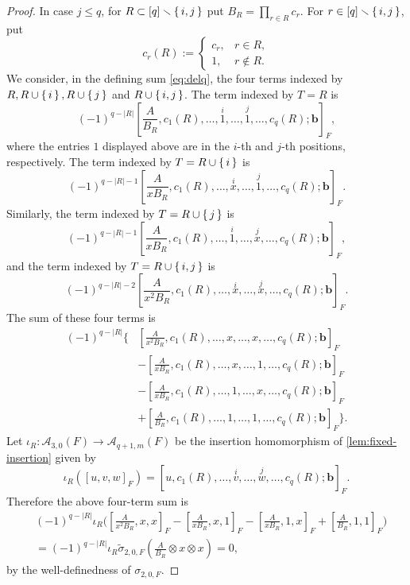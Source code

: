 \documentclass[a4paper,12pt,reqno]{amsart}
\numberwithin{equation}{section}
\theoremstyle{definition}
\newcommand{\Acal}{\mathcal{A}}
\begin{document}
\begin{proof}
In case $j \leq q$, 
for $R\subset[q]\smallsetminus\set{i,j}$ put
$B_R=\prod_{r\in R}c_r$.  
For $r\in[q]\smallsetminus\set{i,j}$, put
\[
 c_r(R):=
 \begin{cases}
 c_r,&r\in R,\\
 1,&r\notin R.
 \end{cases}
\]
We consider, in the defining sum \eqref{eq:delq}, the four terms
indexed by $R, R\cup \set{i}, R\cup \set{j}$ and $R\cup \set{i,j}$. 
The term indexed by $T=R$ is
\[
 (-1)^{q-|R|}
 \left[
 \frac{A}{B_R},
 c_1(R),\ldots,\overset{i}{1},\ldots,\overset{j}{1},\ldots,c_q(R);
 \mathbf b
 \right]_F,
\]
where the entries $1$ displayed above are in the $i$-th and $j$-th
positions, respectively.
The term indexed by $T=R\cup\set{i}$ is
\[
 (-1)^{q-|R|-1}
 \left[
 \frac{A}{xB_R},
 c_1(R),\ldots,\overset{i}x,\ldots,\overset{j}1,\ldots,c_q(R);
 \mathbf b
 \right]_F.
\]
Similarly, the term indexed by $T=R\cup\set{j}$ is
\[
 (-1)^{q-|R|-1}
 \left[
 \frac{A}{xB_R},
 c_1(R),\ldots,\overset{i}{1},\ldots,\overset{j}{x},\ldots,c_q(R);
 \mathbf b
 \right]_F,
\]
and the term indexed by $T=R\cup\set{i,j}$ is
\[
 (-1)^{q-|R|-2}
 \left[
 \frac{A}{x^2B_R},
 c_1(R),\ldots,\overset{i}x,\ldots,\overset{j}x,\ldots,c_q(R);
 \mathbf b
 \right]_F.
\]
The sum of these four terms is
\begin{align*}
(-1)^{q-|R|}
\Biggl\{&
 \left[
 \frac{A}{x^2B_R},
 c_1(R),\ldots,x,\ldots,x,\ldots,c_q(R);
 \mathbf b
 \right]_F\\
&-
 \left[
 \frac{A}{xB_R},
 c_1(R),\ldots,x,\ldots,1,\ldots,c_q(R);
 \mathbf b
 \right]_F\\
&-
 \left[
 \frac{A}{xB_R},
 c_1(R),\ldots,1,\ldots,x,\ldots,c_q(R);
 \mathbf b
 \right]_F\\
&+
 \left[
 \frac{A}{B_R},
 c_1(R),\ldots,1,\ldots,1,\ldots,c_q(R);
 \mathbf b
 \right]_F
\Biggr\}.
\end{align*}
Let $\iota_R:\Acal_{3,0}(F)\to\Acal_{q+1,m}(F)$
be the insertion homomorphism of
\autoref{lem:fixed-insertion} given by 
\[
 \iota_R([u,v,w]_F)
 =
 [u,c_1(R),\ldots,\overset{i}{v},\ldots,\overset{j}{w},\ldots,c_q(R);\mathbf b]_F.
\]
Therefore the above four-term sum is
\begin{align*}
&(-1)^{q-|R|}
\iota_R\Biggl(
 \left[\frac{A}{x^2B_R},x,x\right]_F
 -
 \left[\frac{A}{xB_R},x,1\right]_F
-
 \left[\frac{A}{xB_R},1,x\right]_F
 +
 \left[\frac{A}{B_R},1,1\right]_F
\Biggr) \\
&= (-1)^{q-|R|}\iota_R \widetilde \sigma_{2,0,F}
 \left(
 \frac{A}{B_R}\otimes x\otimes x
 \right) = 0, 
\end{align*}
by the well-definedness of $\sigma_{2,0,F}$.






\end{proof}
\end{document}

